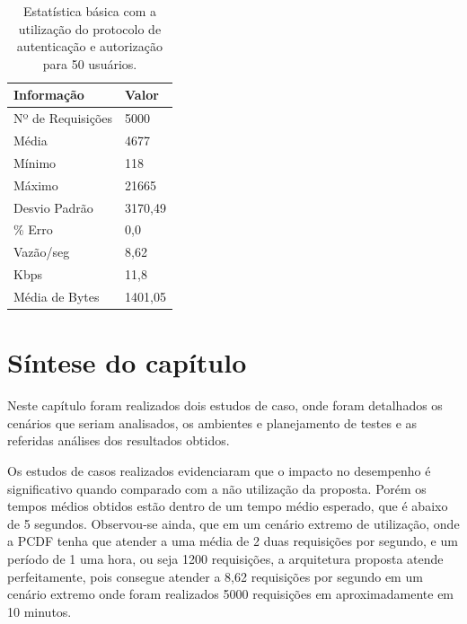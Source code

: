\begin{table}[h]
\centering
\begin{tabular}{|l|l|}
\hline
\textbf{Informação} & \textbf{Valor} \\ \hline
Nº de Requisições   &  5000              \\ \hline
Média               &  4677             \\ \hline
Mínimo              &  118          \\ \hline
Máximo              &  21665        \\ \hline
Desvio Padrão       &  3170,49      \\ \hline
\% Erro             &  0,0          \\ \hline
Vazão/seg           &  8,62     \\ \hline
Kbps                &  11,8         \\ \hline
Média de Bytes      &  1401,05      \\ \hline
\end{tabular}
\caption {Estatística básica com a utilização do protocolo de autenticação e autorização para 50 usuários.}\label{tb:estatistica_com_cripto_50}
\end{table}

\section{Síntese do capítulo}
Neste capítulo foram realizados dois estudos de caso, onde foram detalhados os cenários que seriam analisados, os ambientes e planejamento de testes e as referidas análises dos resultados obtidos.

Os estudos de casos realizados evidenciaram que o impacto no desempenho é significativo quando comparado com a não utilização da proposta. Porém os tempos médios obtidos estão dentro de um tempo médio esperado, que é abaixo de 5 segundos. Observou-se ainda, que em um cenário extremo de utilização, onde a PCDF tenha que atender a uma média de 2 duas requisições por segundo, e um período de 1 uma hora, ou seja 1200 requisições, a arquitetura proposta atende perfeitamente, pois consegue atender a 8,62 requisições por segundo em um cenário extremo onde foram realizados 5000 requisições em aproximadamente em 10 minutos.

